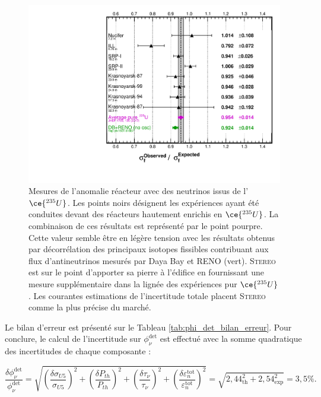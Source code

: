 {\begin{figure}[h!]
  \centering
  \includegraphics[width=0.8\linewidth]{images/RAA_NO_STEREO.pdf}
  \caption[Mesures de l'anomalie réacteur avec des neutrinos issus de l'$\ce{^{235}U}$]{Mesures de l'anomalie réacteur avec des neutrinos issus de l'$\ce{^{235}U}$. Les points noirs désignent les expériences ayant été conduites devant des réacteurs hautement enrichis en $\ce{^{235}U}$. La combinaison de ces résultats est représenté par le point pourpre. Cette valeur semble être en légère tension avec les résultats obtenus par décorrélation des principaux isotopes fissibles contribuant aux flux d'antineutrinos mesurés par Daya Bay et RENO (vert). \textsc{Stereo} est sur le point d'apporter sa pierre à l'édifice en fournissant une mesure supplémentaire dans la lignée des expériences pur $\ce{^{235}U}$. Les courantes estimations de l'incertitude totale placent \textsc{Stereo} comme la plus précise du marché.}\label{fig:RAA_NO_STEREO.pdf}
\end{figure}

\clearpage

}

Le bilan d'erreur est présenté sur le Tableau \ref{tab:phi_det_bilan_erreur}. Pour conclure, le calcul de l'incertitude sur $\phi_\nu^{\textrm{det}}$ est effectué avec la somme quadratique des incertitudes de chaque composante :

\begin{equation}
    \frac{\delta \phi_\nu^{\textrm{det}}}{\phi_\nu^{\textrm{det}}} = \sqrt{ \left(\frac{\delta \sigma_{U5}}{\sigma_{U5}}\right)^2 + \left(\frac{\delta P_{th}}{P_{th}}\right)^2 + \left(\frac{\delta \tau_\nu}{\tau_\nu}\right)^2 + \left(\frac{\delta \varepsilon^\textrm{tot}_n}{\varepsilon^\textrm{tot}_n}\right)^2 } = \sqrt{2,44^2_\textrm{th} + 2,54^2_\textrm{exp}} = 3,5 \%.
\end{equation}

